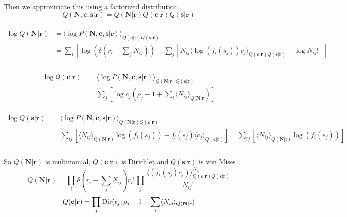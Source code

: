 \documentclass[12pt]{article}
\begin{document}
\\
Then we approximate this using a factorized distribution:\\
\begin{equation}
Q(\mathbf{N, c, s|r}) = Q(\mathbf{N|r}) Q(\mathbf{c|r}) Q(\mathbf{s|r})
\end{equation}
\\
\begin{equation}
\begin{aligned}
\log Q(\mathbf{N|r}) &= \langle \log P(\mathbf{N, c, s|r}) \rangle_{Q(\mathbf{c|r})Q(\mathbf{s|r})}\\
&= \sum_i [\log(\delta(r_i - \sum_j N_{ij})) - \sum_j [N_{ij} \langle \log(f_i (s_j)) c_j \rangle_{Q(\mathbf{c|r})Q(\mathbf{s|r})} - \log N_{ij}!]]\\
\end{aligned}
\end{equation}
\\
\begin{equation}
\begin{aligned}
\log Q(\mathbf{c|r}) &= \langle \log P(\mathbf{N, c, s|r}) \rangle_{Q(\mathbf{N|r})Q(\mathbf{s|r})}\\
&= \sum_j [\log c_j(\rho_j - 1 + \sum_i \langle N_{ij} \rangle_{Q(\mathbf{N|r}})]
\end{aligned}
\end{equation}
\\
\begin{equation}
\begin{aligned}
\log Q(\mathbf{s|r}) &= \langle \log P(\mathbf{N, c, s|r}) \rangle_{Q(\mathbf{N|r})Q(\mathbf{c|r})}\\
&= \sum_{ij} [\langle N_{ij} \rangle_{Q(\mathbf{N|r})} \log(f_i(s_j)) - f_i(s_j) \langle c_j \rangle_{Q(\mathbf{c|r})}] = \sum_{ij} [\langle N_{ij} \rangle_{Q(\mathbf{N|r})} \log(f_i(s_j))]\\
\end{aligned}
\end{equation}
\\
So $Q(\mathbf{N|r})$ is multinomial, $Q(\mathbf{c|r})$ is Dirichlet and $Q(\mathbf{s|r})$ is von Mises\\
\begin{equation}
Q(\mathbf{N|r}) = \prod_i \delta(r_i - \sum_j N_{ij}) r_i! \prod_j \frac{\langle (f_i (s_j) c_j) \rangle_{Q(\mathbf{c|r})Q(\mathbf{s|r})}^{N_{ij}}}{N_{ij}!}
\end{equation}
\begin{equation}
Q(\mathbf{c|r}) = \prod_j \text{Dir}(c_j; \rho_j - 1 + \sum_i \langle N_{ij} \rangle_{Q(\mathbf{N|r}})\\
\end{equation}
\\
\end{document}

